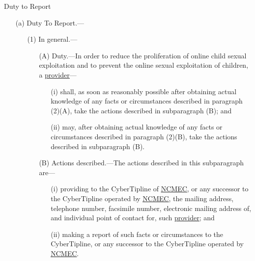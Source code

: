 \documentclass[nobackground,dvipsnames,table,aspectratio=169]{beamer}
\begin{document}
\begin{frame}{Duty to Report}
    \begin{enumerate}
        \item[(a)]Duty To Report.—
        \begin{enumerate}
            \item[(1)]In general.—
            \begin{enumerate}
                \item[(A)]Duty.—In order to reduce the proliferation of online child sexual exploitation and to prevent the online sexual exploitation of children, a \underline{\href{https://www.law.cornell.edu/definitions/uscode.php?width=840&height=800&iframe=true&def_id=18-USC-987494927-970461075&term_occur=999&term_src=title:18:part:I:chapter:110:section:2258A}{provider}}—
                \begin{enumerate}
                    \item[(i)]shall, as soon as reasonably possible after obtaining actual knowledge of any facts or circumstances described in paragraph (2)(A), take the actions described in subparagraph (B); and
                    \item[(ii)]may, after obtaining actual knowledge of any facts or circumstances described in paragraph (2)(B), take the actions described in subparagraph (B).
                \end{enumerate}
                \item[(B)]Actions described.—The actions described in this subparagraph are—
                \begin{enumerate}
                    \item[(i)]providing to the CyberTipline of \underline{\href{https://www.law.cornell.edu/definitions/uscode.php?width=840&height=800&iframe=true&def_id=18-USC-74106838-970461074&term_occur=999&term_src=title:18:part:I:chapter:110:section:2258A}{NCMEC}}, or any successor to the CyberTipline operated by \underline{\href{https://www.law.cornell.edu/definitions/uscode.php?width=840&height=800&iframe=true&def_id=18-USC-74106838-970461074&term_occur=999&term_src=title:18:part:I:chapter:110:section:2258A}{NCMEC}}, the mailing address, telephone number, facsimile number, electronic mailing address of, and individual point of contact for, such \underline{\href{https://www.law.cornell.edu/definitions/uscode.php?width=840&height=800&iframe=true&def_id=18-USC-987494927-970461075&term_occur=999&term_src=title:18:part:I:chapter:110:section:2258A}{provider}}; and
                    \item[(ii)]making a report of such facts or circumstances to the CyberTipline, or any successor to the CyberTipline operated by \underline{\href{https://www.law.cornell.edu/definitions/uscode.php?width=840&height=800&iframe=true&def_id=18-USC-74106838-970461074&term_occur=999&term_src=title:18:part:I:chapter:110:section:2258A}{NCMEC}}.
                \end{enumerate}
            \end{enumerate}
        \end{enumerate}
    \end{enumerate}
\end{frame}%
\end{document}
